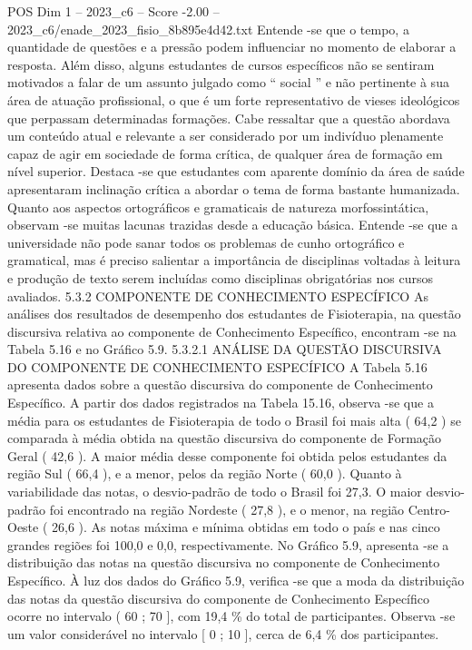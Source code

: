\begin{textsample}{POS Dim 1 – 2023\_c6 – Score -2.00 – 2023\_c6/enade\_2023\_fisio\_8b895e4d42.txt}
Entende -se que o tempo, a quantidade de questões e a pressão podem influenciar no momento de elaborar a resposta.
Além disso, alguns estudantes de cursos específicos não se sentiram motivados a falar de um assunto julgado como “ social ” e não pertinente à sua área de atuação profissional, o que é um forte representativo de vieses ideológicos que perpassam determinadas formações.
Cabe ressaltar que a questão abordava um conteúdo atual e relevante a ser considerado por um indivíduo plenamente capaz de agir em sociedade de forma crítica, de qualquer área de formação em nível superior.
Destaca -se que estudantes com aparente domínio da área de saúde apresentaram inclinação crítica a abordar o tema de forma bastante humanizada.
Quanto aos aspectos ortográficos e gramaticais de natureza morfossintática, observam -se muitas lacunas trazidas desde a educação básica.
Entende -se que a universidade não pode sanar todos os problemas de cunho ortográfico e gramatical, mas é preciso salientar a importância de disciplinas voltadas à leitura e produção de texto serem incluídas como disciplinas obrigatórias nos cursos avaliados. 5.3.2 COMPONENTE DE CONHECIMENTO ESPECÍFICO As análises dos resultados de desempenho dos estudantes de Fisioterapia, na questão discursiva relativa ao componente de Conhecimento Específico, encontram -se na Tabela 5.16 e no Gráfico 5.9. 5.3.2.1 ANÁLISE DA QUESTÃO DISCURSIVA DO COMPONENTE DE CONHECIMENTO ESPECÍFICO A Tabela 5.16 apresenta dados sobre a questão discursiva do componente de Conhecimento Específico.
A partir dos dados registrados na Tabela 15.16, observa -se que a média para os estudantes de Fisioterapia de todo o Brasil foi mais alta ( 64,2 ) se comparada à média obtida na questão discursiva do componente de Formação Geral ( 42,6 ).
A maior média desse componente foi obtida pelos estudantes da região Sul ( 66,4 ), e a menor, pelos da região Norte ( 60,0 ).
Quanto à variabilidade das notas, o desvio-padrão de todo o Brasil foi 27,3.
O maior desvio-padrão foi encontrado na região Nordeste ( 27,8 ), e o menor, na região Centro-Oeste ( 26,6 ).
As notas máxima e mínima obtidas em todo o país e nas cinco grandes regiões foi 100,0 e 0,0, respectivamente.
No Gráfico 5.9, apresenta -se a distribuição das notas na questão discursiva no componente de Conhecimento Específico.
À luz dos dados do Gráfico 5.9, verifica -se que a moda da distribuição das notas da questão discursiva do componente de Conhecimento Específico ocorre no intervalo ( 60 ; 70 ], com 19,4 \% do total de participantes.
Observa -se um valor considerável no intervalo [ 0 ; 10 ], cerca de 6,4 \% dos participantes.

\end{textsample}
